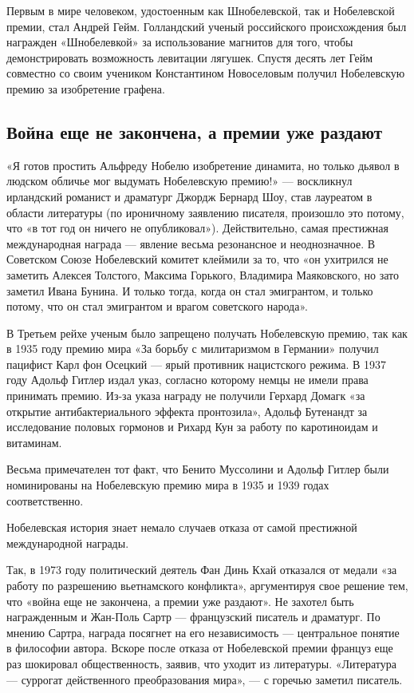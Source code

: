 Первым в мире человеком, удостоенным как Шнобелевской, так и Нобелевской премии, стал Андрей Гейм. Голландский ученый российского происхождения был награжден «Шнобелевкой» за использование магнитов для того, чтобы демонстрировать возможность левитации лягушек. Спустя десять лет Гейм совместно со своим учеником Константином Новоселовым получил Нобелевскую премию за изобретение графена.

\subsection{Война еще не закончена, а премии уже раздают}
«Я готов простить Альфреду Нобелю изобретение динамита, но только дьявол в людском обличье мог выдумать Нобелевскую премию!» — воскликнул ирландский романист и драматург Джордж Бернард Шоу, став лауреатом в области литературы (по ироничному заявлению писателя, произошло это потому, что «в тот год он ничего не опубликовал»). Действительно, самая престижная международная награда — явление весьма резонансное и неоднозначное. В Советском Союзе Нобелевский комитет клеймили за то, что «он ухитрился не заметить Алексея Толстого, Максима Горького, Владимира Маяковского, но зато заметил Ивана Бунина. И только тогда, когда он стал эмигрантом, и только потому, что он стал эмигрантом и врагом советского народа».

В Третьем рейхе ученым было запрещено получать Нобелевскую премию, так как в 1935 году премию мира «За борьбу с милитаризмом в Германии» получил пацифист Карл фон Осецкий — ярый противник нацистского режима. В 1937 году Адольф Гитлер издал указ, согласно которому немцы не имели права принимать премию. Из-за указа награду не получили Герхард Домагк «за открытие антибактериального эффекта пронтозила», Адольф Бутенандт за исследование половых гормонов и Рихард Кун за работу по каротиноидам и витаминам.


\begin{fancyquotes}
    Весьма примечателен тот факт, что Бенито Муссолини и Адольф Гитлер были номинированы на Нобелевскую премию мира в 1935 и 1939 годах соответственно.
\end{fancyquotes}

Нобелевская история знает немало случаев отказа от самой престижной международной награды.

Так, в 1973 году политический деятель Фан Динь Кхай отказался от медали «за работу по разрешению вьетнамского конфликта», аргументируя свое решение тем, что «война еще не закончена, а премии уже раздают». Не захотел быть награжденным и Жан-Поль Сартр — французский писатель и драматург. По мнению Сартра, награда посягнет на его независимость — центральное понятие в философии автора. Вскоре после отказа от Нобелевской премии француз еще раз шокировал общественность, заявив, что уходит из литературы. «Литература — суррогат действенного преобразования мира», — с горечью заметил писатель.

